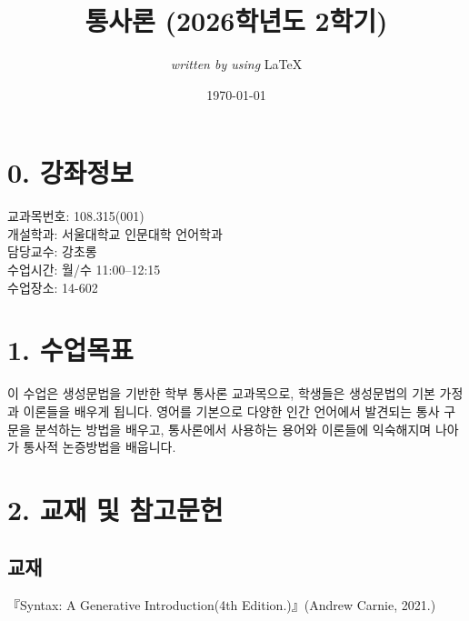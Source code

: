\documentclass{article}
\begin{document}
\title{통사론 (2026학년도 2학기)}
\author{\textit{written by using} \LaTeX}
\date{\today}
\maketitle
\thispagestyle{fancy}
\setcounter{secnumdepth}{0}
\bigskip

\section{0. 강좌정보}
\medskip
교과목번호: 108.315(001)\\
개설학과: 서울대학교 인문대학 언어학과\\
담당교수: 강초롱\\
수업시간: 월/수 11:00--12:15\\
수업장소: 14-602

\section{1. 수업목표}
\medskip
이 수업은 생성문법을 기반한 학부 통사론 교과목으로, 학생들은 생성문법의 기본 가정과 이론들을 배우게 됩니다. 영어를 기본으로 다양한 인간 언어에서 발견되는 통사 구문을 분석하는 방법을 배우고, 통사론에서 사용하는 용어와 이론들에 익숙해지며 나아가 통사적 논증방법을 배웁니다.

\section{2. 교재 및 참고문헌}
\medskip
\subsection{교재}
『Syntax: A Generative Introduction(4th Edition.)』(Andrew Carnie, 2021.)

\newpage
\end{document}
